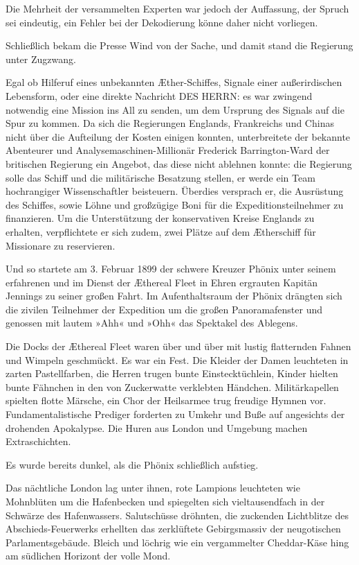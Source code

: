 Die Mehrheit der versammelten Experten war jedoch der Auffassung,
der Spruch sei eindeutig, ein Fehler bei der Dekodierung könne
daher nicht vorliegen.

Schließlich bekam die Presse Wind von der Sache, und damit stand
die Regierung unter Zugzwang.

\bigpar

Egal ob Hilferuf eines unbekannten Æther-Schiffes, Signale einer
außerirdischen Lebensform, oder eine direkte Nachricht DES HERRN:
es war zwingend notwendig eine Mission ins All zu senden, um dem
Ursprung des Signals auf die Spur zu kommen. Da sich die
Regierungen Englands, Frankreichs und Chinas nicht über die
Aufteilung der Kosten einigen konnten, unterbreitete der bekannte
Abenteurer und Analysemaschinen-Millionär Frederick Barrington-Ward
der britischen Regierung ein Angebot, das diese nicht ablehnen
konnte: die Regierung solle das Schiff und die militärische
Besatzung stellen, er werde ein Team hochrangiger Wissenschaftler
beisteuern. Überdies versprach er, die Ausrüstung des Schiffes,
sowie Löhne und großzügige Boni für die Expeditionsteilnehmer zu
finanzieren. Um die Unterstützung der konservativen Kreise Englands
zu erhalten, verpflichtete er sich zudem, zwei Plätze auf dem
Ætherschiff für Missionare zu reservieren.

\bigpar

Und so startete am 3. Februar 1899 der schwere Kreuzer Phönix unter
seinem erfahrenen und im Dienst der Æthereal Fleet in Ehren
ergrauten Kapitän Jennings zu seiner großen Fahrt. Im
Aufenthaltsraum der Phönix drängten sich die zivilen Teilnehmer der
Expedition um die großen Panoramafenster und genossen mit lautem
»Ahh« und »Ohh« das Spektakel des Ablegens.

Die Docks der Æthereal Fleet waren über und über mit lustig
flatternden Fahnen und Wimpeln geschmückt. Es war ein Fest. Die
Kleider der Damen leuchteten in zarten Pastellfarben, die Herren
trugen bunte Einstecktüchlein, Kinder hielten bunte Fähnchen in den
von Zuckerwatte verklebten Händchen. Militärkapellen spielten
flotte Märsche, ein Chor der Heilsarmee trug freudige Hymnen vor.
Fundamentalistische Prediger forderten zu Umkehr und Buße auf
angesichts der drohenden Apokalypse. Die Huren aus London und
Umgebung machen Extraschichten.

Es wurde bereits dunkel, als die Phönix schließlich aufstieg.

Das nächtliche London lag unter ihnen, rote Lampions leuchteten wie
Mohnblüten um die Hafenbecken und spiegelten sich vieltausendfach
in der Schwärze des Hafenwassers. Salutschüsse dröhnten, die
zuckenden Lichtblitze des Abschieds-Feuerwerks erhellten das
zerklüftete Gebirgsmassiv der neugotischen Parlamentsgebäude.
Bleich und löchrig wie ein vergammelter Cheddar-Käse hing am
südlichen Horizont der volle Mond.

